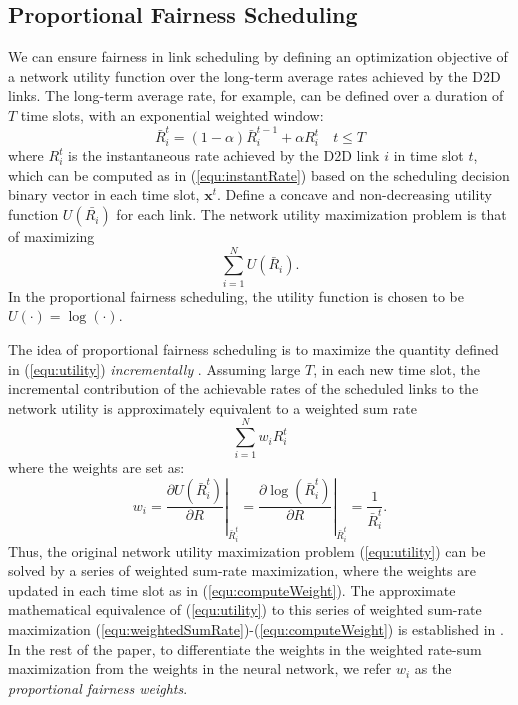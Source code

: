 \documentclass[journal,12pt,onecolumn,draftclsnofoot,]{IEEEtran}
\begin{document}
\subsection{Proportional Fairness Scheduling}

We can ensure fairness in link scheduling by defining an optimization
objective of a network utility function over the long-term average
rates achieved by the D2D links. The long-term average rate, for example, can
be defined over a duration of $T$ time slots, with an exponential weighted window:
\begin{equation}
	\bar R_i^t = (1-\alpha) \bar R_i^{t-1} + \alpha R_i^t \quad t\leq T
\end{equation}
where $R_i^t$ is the instantaneous rate achieved by the D2D link $i$ in
time slot $t$, which can be computed as in (\ref{equ:instantRate}) based on
the scheduling decision binary vector in each time slot, $\mathbf{x}^t$.
Define a concave and non-decreasing utility function $U(\bar{R_i})$ for each
link. The network utility maximization problem is that of maximizing
\begin{equation} \label{equ:utility}
\sum_{i=1}^{N} U(\bar R_i).
\end{equation}
In the proportional fairness scheduling, the utility function is chosen to be
$U(\cdot) = \log(\cdot)$.

The idea of proportional fairness scheduling is to maximize the quantity
defined in (\ref{equ:utility}) \emph{incrementally} \cite{tse_pf}.
Assuming large $T$, in each new time slot, the incremental contribution of the
achievable rates of the scheduled links to the network utility is approximately
equivalent to a weighted sum rate \cite{berry}
\begin{equation}\label{equ:weightedSumRate}
	\sum_{i=1}^N w_i R_i^t
\end{equation}
where the weights are set as:
\begin{equation} \label{equ:computeWeight}
	w_i = \left.\frac{\partial U(\bar R_i^t)}{\partial R}\right|_{\bar R_i^t}
    	= \left.\frac{\partial \log(\bar R_i^t)}{\partial R}\right|_{\bar R_i^t}
        = \frac{1}{\bar R_i^t}.
\end{equation}
Thus, the original network utility
maximization problem (\ref{equ:utility}) can be solved by a series of weighted
sum-rate maximization, where the weights are updated in each time slot as in
(\ref{equ:computeWeight}).  The approximate mathematical equivalence of (\ref{equ:utility}) to this series of weighted sum-rate maximization
(\ref{equ:weightedSumRate})-(\ref{equ:computeWeight}) is established in \cite{kushner}.
In the rest of the paper, to differentiate the weights in the weighted rate-sum
maximization from the weights in the neural network, we refer $w_i$ as 
the \emph{proportional fairness weights}.
\end{document}
